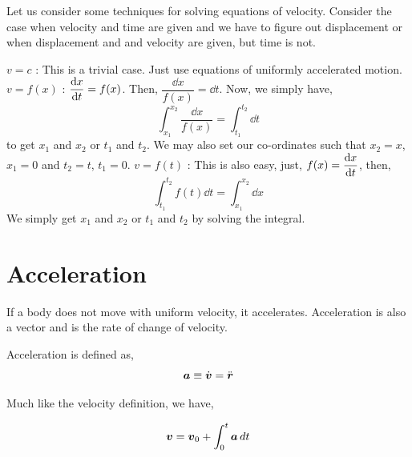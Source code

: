 
\begin{algorithm}
    Let us consider some techniques for solving equations of velocity. Consider the case when velocity and time are given
    and we have to figure out displacement or when displacement and and velocity are given, but time is not. 
    \begin{enumerate}
        \ii \(v = c\) : This is a trivial case. Just use equations of uniformly accelerated motion.
        \ii \(v = f(x)\) : \(\displaystyle \dv{x}{t} = f(x)\). Then, \(\dfrac{\dd{x}}{f(x)} = \dd{t}\).
        Now, we simply have, \[
            \int^{x_2}_{x_1} \frac{\dd{x}}{f(x)} = \int^{t_2}_{t_1} \dd{t}
        \] to get \(x_1\) and \(x_2\) or \(t_1\) and \(t_2\). We may also set our co-ordinates such that \(x_2 = x\), \(x_1 = 0\) and \(t_2 = t\), \(t_1 = 0\).
        \ii \(v = f(t)\) : This is also easy, just, \(\displaystyle f(x) = \dv{x}{t}\), then,
        \[
            \int^{t_2}_{t_1} f(t) \dd{t} = \int^{x_2}_{x_1} \dd{x}
        \] We simply get \(x_1\) and \(x_2\) or \(t_1\) and \(t_2\) by solving the integral.
    \end{enumerate}
\end{algorithm}

\section{Acceleration}

If a body does not move with uniform velocity, it accelerates. Acceleration is also a vector and
is the rate of change of velocity.


\begin{definition}
    [Acceleration]
    \label{def: acceleration}
    Acceleration is defined as,
    \begin{equation}
        \boldsymbol{a} \equiv \dot{\boldsymbol{v}} = \ddot{\boldsymbol{r}}    
    \end{equation}
\end{definition}

Much like the velocity definition, we have,

\begin{equation}
    \boldsymbol{v} = \boldsymbol{v}_0 + \int_0^t \boldsymbol{a} \mathop{}\!{d}{t}
\end{equation}

